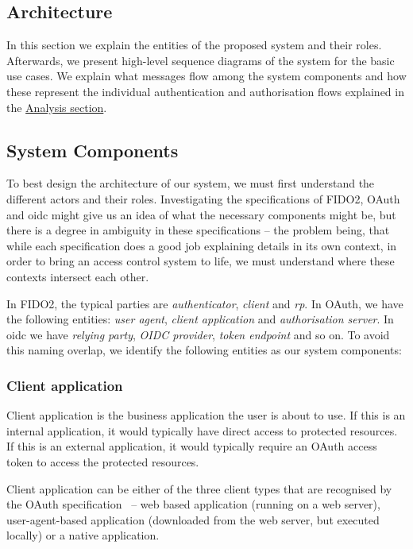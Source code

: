 \subsection{Architecture}

In this section we explain the entities of the proposed system and their roles. Afterwards, we present high-level sequence diagrams of the system for the basic use cases. We explain what messages flow among the system components and how these represent the individual authentication and authorisation flows explained in the \href{sec:analysis}{Analysis section}.

\subsection{System Components}
To best design the architecture of our system, we must first understand the different actors and their roles. Investigating the specifications of FIDO2, OAuth and \acrshort{oidc} might give us an idea of what the necessary components might be, but there is a degree in ambiguity in these specifications -- the problem being, that while each specification does a good job explaining details in its own context, in order to bring an access control system to life, we must understand where these contexts intersect each other.

In FIDO2, the typical parties are \textit{authenticator}, \textit{client} and \textit{\acrshort{rp}}. In OAuth, we have the following entities: \textit{user agent}, \textit{client application} and \textit{authorisation server}. In \acrshort{oidc} we have \textit{relying party}, \textit{OIDC provider}, \textit{token endpoint} and so on. To avoid this naming overlap, we identify the following entities as our system components:
% 

\subsubsection{Client application} 
Client application is the business application the user is about to use. If this is an internal application, it would typically have direct access to protected resources. If this is an external application, it would typically require an OAuth access token to access the protected resources.
    
Client application can be either of the three client types that are recognised by the OAuth specification~\cite{Hardt2012TheFramework} -- web based application (running on a web server), user-agent-based application (downloaded from the web server, but executed locally) or a native application.
    
